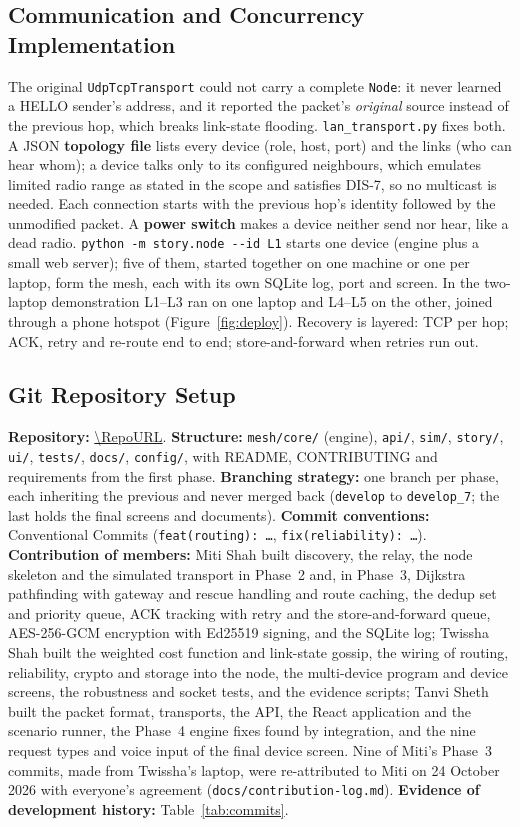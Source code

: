 \subsection{Communication and Concurrency Implementation}
\label{sec:lan}
The original \texttt{UdpTcpTransport} could not carry a complete \texttt{Node}: it never learned a HELLO sender's address, and it reported the packet's \emph{original} source instead of the previous hop, which breaks link-state flooding. \texttt{lan\_transport.py} fixes both. A JSON \textbf{topology file} lists every device (role, host, port) and the links (who can hear whom); a device talks only to its configured neighbours, which emulates limited radio range as stated in the scope and satisfies DIS-7, so no multicast is needed. Each connection starts with the previous hop's identity followed by the unmodified packet. A \textbf{power switch} makes a device neither send nor hear, like a dead radio. \texttt{python -m story.node -{}-id L1} starts one device (engine plus a small web server); five of them, started together on one machine or one per laptop, form the mesh, each with its own SQLite log, port and screen. In the two-laptop demonstration L1--L3 ran on one laptop and L4--L5 on the other, joined through a phone hotspot (Figure~\ref{fig:deploy}). Recovery is layered: TCP per hop; ACK, retry and re-route end to end; store-and-forward when retries run out.

\subsection{Git Repository Setup}
\label{sec:git}
\textbf{Repository:} \url{\RepoURL}. \textbf{Structure:} \texttt{mesh/core/} (engine), \texttt{api/}, \texttt{sim/}, \texttt{story/}, \texttt{ui/}, \texttt{tests/}, \texttt{docs/}, \texttt{config/}, with README, CONTRIBUTING and requirements from the first phase. \textbf{Branching strategy:} one branch per phase, each inheriting the previous and never merged back (\texttt{develop} to \texttt{develop\_7}; the last holds the final screens and documents). \textbf{Commit conventions:} Conventional Commits (\texttt{feat(routing): \ldots}, \texttt{fix(reliability): \ldots}). \textbf{Contribution of members:} Miti Shah built discovery, the relay, the node skeleton and the simulated transport in Phase~2 and, in Phase~3, Dijkstra pathfinding with gateway and rescue handling and route caching, the dedup set and priority queue, ACK tracking with retry and the store-and-forward queue, AES-256-GCM encryption with Ed25519 signing, and the SQLite log; Twissha Shah built the weighted cost function and link-state gossip, the wiring of routing, reliability, crypto and storage into the node, the multi-device program and device screens, the robustness and socket tests, and the evidence scripts; Tanvi Sheth built the packet format, transports, the API, the React application and the scenario runner, the Phase~4 engine fixes found by integration, and the nine request types and voice input of the final device screen. Nine of Miti's Phase~3 commits, made from Twissha's laptop, were re-attributed to Miti on 24 October 2026 with everyone's agreement (\texttt{docs/contribution-log.md}). \textbf{Evidence of development history:} Table~\ref{tab:commits}.

